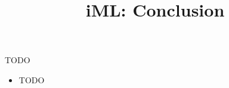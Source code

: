\documentclass[aspectratio=169]{../latex_main/tntbeamer}  %
\title[Conclusion]{iML: Conclusion}
\subtitle{}
\begin{document}
	
	\maketitle


\begin{frame}[c]{TODO}
 
	\begin{itemize}
		\item TODO
	\end{itemize}
\end{frame}
\end{document}
